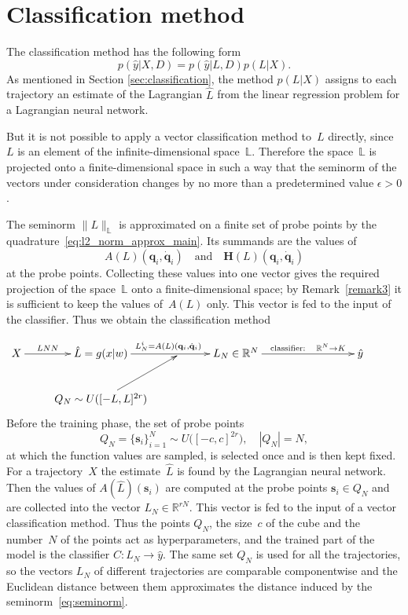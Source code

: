 \documentclass[sn-mathphys-num]{sn-jnl}
\theoremstyle{thmstylethree}
\theoremstyle{thmstyletwo}
\theoremstyle{thmstyleone}
\begin{document}
\section{Classification method} \label{sec:classifier}
The classification method has the following form 
\[
p(\hat{y}|X, D) = p(\hat{y}|L, D)p(L|X).
\] 
As mentioned in Section \ref{sec:classification}, the method $p(L|X)$ assigns to each trajectory an estimate of the Lagrangian $\hat{L}$ from the linear regression problem for a Lagrangian neural network.

But it is not possible to apply a vector classification method to~$L$ directly, since $L$ is an element of the infinite-dimensional space~$\mathbb{L}$. Therefore the space~$\mathbb{L}$ is projected onto a finite-dimensional space in such a way that the seminorm of the vectors under consideration changes by no more than a predetermined value $\epsilon > 0$.

The seminorm $\|L\|_{\mathbb{L}}$ is approximated on a finite set of probe points by the quadrature~\eqref{eq:l2_norm_approx_main}. Its summands are the values of
\[
A(L)\left(\mathbf{q}_i, \dot{\mathbf{q}}_i\right)
\quad \text{and} \quad
\mathbf{H}(L)\left(\mathbf{q}_i, \dot{\mathbf{q}}_i\right)
\]
at the probe points. Collecting these values into one vector gives the required projection of the space~$\mathbb{L}$ onto a finite-dimensional space; by Remark~\ref{remark3} it is sufficient to keep the values of~$A(L)$ only. This vector is fed to the input of the classifier. Thus we obtain the classification method

\begin{equation}
\xymatrix{
X  \ar@{->}[r]^-{LNN}  & \hat{L}=g(x|w) \ar@{->}[rr]^{{L_N^{i} = A(L)\left(\mathbf{q}_i, \dot{\mathbf{q}}_i\right)}} & {} & L_N \in \mathbb{R}^N \ar@{->}[rrr]^-{\text{classifier}:\quad \mathbb{R}^N \to K} &  &  & \hat{y} \\
 & Q_N \sim U([-L, L]^{2r}) \ar@{->}[ur]  &  &  &  &  &  &
}
\label{fig: classificator}
\end{equation}
Before the training phase, the set of probe points
\[
Q_N = \{\mathbf{s}_i\}_{i=1}^N \sim U\bigl([-c, c]^{2r}\bigr), \quad |Q_N| = N,
\]
at which the function values are sampled, is selected once and is then kept fixed. For a trajectory~$X$ the estimate~$\hat{L}$ is found by the Lagrangian neural network. Then the values of $A(\hat{L})(\mathbf{s}_i)$ are computed at the probe points $\mathbf{s}_i \in Q_N$ and are collected into the vector $L_N \in \mathbb{R}^{rN}$. This vector is fed to the input of a vector classification method. Thus the points $Q_N$, the size~$c$ of the cube and the number~$N$ of the points act as hyperparameters, and the trained part of the model is the classifier $C \colon L_N \to \hat{y}$. The same set $Q_N$ is used for all the trajectories, so the vectors $L_N$ of different trajectories are comparable componentwise and the Euclidean distance between them approximates the distance induced by the seminorm~\eqref{eq:seminorm}.
\end{document}
